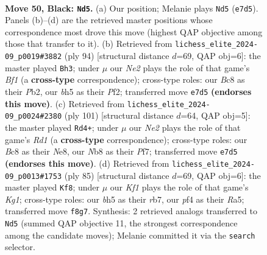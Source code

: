 \documentclass[11pt]{article}
\begin{document}
\clearpage

\begin{figure}[p]\centering
\begin{subfigure}{0.46\textwidth}\centering
\resizebox{\linewidth}{!}{%
\newchessgame
\chessboard[
  setfen={1nb2k2/r3n3/4p3/1P3p1B/1pN2P2/1P4PN/6KP/7R b - - 0 50},
  showmover=false,
  pgfstyle=straightmove, color=movearrow, markmove={e7-d5}
]}
\caption{}
\end{subfigure}\hfill
\begin{subfigure}{0.46\textwidth}\centering
\resizebox{\linewidth}{!}{%
\newchessgame
\chessboard[
  setfen={1r3n2/1p3pk1/1Np2p2/7b/2P4P/P7/1P1R1P2/5BK1 w - - 0 48},
  showmover=false,
  pgfstyle=straightmove, color=movearrow, markmove={f1-h3}
]}
\caption{}
\end{subfigure}
\\[4pt]
\begin{subfigure}{0.46\textwidth}\centering
\resizebox{\linewidth}{!}{%
\newchessgame
\chessboard[
  setfen={3rn3/1p2kp2/2p5/4PP2/pPP3K1/P5N1/7P/7R b - - 0 51},
  showmover=false,
  pgfstyle=straightmove, color=movearrow, markmove={d8-d4}
]}
\caption{}
\end{subfigure}\hfill
\begin{subfigure}{0.46\textwidth}\centering
\resizebox{\linewidth}{!}{%
\newchessgame
\chessboard[
  setfen={6k1/1R6/3p4/r2n1np1/3p2Np/5P1P/1P4P1/3NK3 b - - 1 43},
  showmover=false,
  pgfstyle=straightmove, color=movearrow, markmove={g8-f8}
]}
\caption{}
\end{subfigure}
\caption{\textbf{Move 50, Black: \texttt{Nd5}.} (a) Our position; Melanie plays \texttt{Nd5} (\texttt{e7d5}). Panels (b)--(d) are the retrieved master positions whose correspondence most drove this move (highest QAP objective among those that transfer to it). (b) Retrieved from \texttt{lichess\_elite\_2024-09\_p0019\#3882} (ply 94) [structural distance $d$=69, QAP obj=6]: the master played \texttt{Bh3}; under $\mu$ our \emph{Ne2} plays the role of that game's \emph{Bf1} (a \textbf{cross-type} correspondence); cross-type roles: our \emph{B}c8 as their \emph{P}b2, our \emph{b}h5 as their \emph{P}f2; transferred move \texttt{e7d5} \textbf{(endorses this move)}. (c) Retrieved from \texttt{lichess\_elite\_2024-09\_p0024\#2380} (ply 101) [structural distance $d$=64, QAP obj=5]: the master played \texttt{Rd4+}; under $\mu$ our \emph{Ne2} plays the role of that game's \emph{Rd1} (a \textbf{cross-type} correspondence); cross-type roles: our \emph{B}c8 as their \emph{N}e8, our \emph{N}b8 as their \emph{P}f7; transferred move \texttt{e7d5} \textbf{(endorses this move)}. (d) Retrieved from \texttt{lichess\_elite\_2024-09\_p0013\#1753} (ply 85) [structural distance $d$=69, QAP obj=6]: the master played \texttt{Kf8}; under $\mu$ our \emph{Kf1} plays the role of that game's \emph{Kg1}; cross-type roles: our \emph{b}h5 as their \emph{r}b7, our \emph{p}f4 as their \emph{R}a5; transferred move \texttt{f8g7}. Synthesis: 2 retrieved analogs transferred to \texttt{Nd5} (summed QAP objective 11, the strongest correspondence among the candidate moves); Melanie committed it via the \texttt{search} selector.}
\label{fig:thought-m99}
\end{figure}
\end{document}
